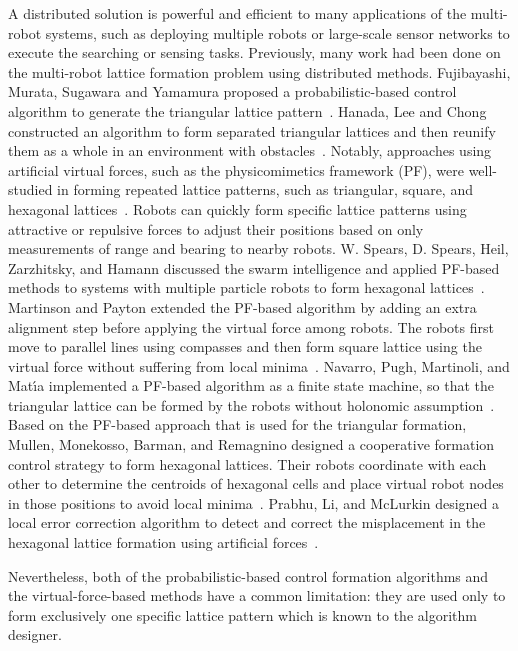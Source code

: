 A distributed solution is powerful and efficient to many applications of the multi-robot systems,
such as deploying multiple robots or large-scale sensor networks to execute the searching or sensing tasks. 
%
Previously, many work had been done on the multi-robot lattice formation
problem using distributed methods. 
%
Fujibayashi, Murata, Sugawara and Yamamura proposed a probabilistic-based control algorithm to generate the triangular lattice pattern~\cite{FujMurSugYam02}. 
%
Hanada, Lee and Chong constructed an algorithm to form separated triangular lattices and then reunify
them as a whole in an environment with obstacles~\cite{HanLeeCho07}.  
%
Notably, approaches using artificial virtual forces, such as the physicomimetics framework (PF), 
were well-studied in forming repeated lattice patterns, such as
triangular, square, and hexagonal lattices~\cite{FujMurSugYam02, HanLeeCho07,
  SpeSpeHamHei04, SpeHeiZar05, MarPay2005, NavPugMarMat09, LeeBecFekKroMcL14,
  PraLiMcLu12, MulMonBarRem13}. 
%  
Robots can quickly form specific lattice patterns using attractive or repulsive forces to adjust their positions based on only measurements of range and bearing to nearby robots.  
%
W. Spears, D. Spears, Heil, Zarzhitsky, and Hamann discussed the swarm intelligence and applied PF-based
methods to systems with multiple particle robots to form hexagonal lattices~\cite{SpeSpeHamHei04}.  
%
Martinson and Payton extended the PF-based algorithm by adding an extra alignment step before applying the virtual force among robots.  
%
The robots first move to parallel lines using compasses and then form square lattice using 
the virtual force without suffering from local minima~\cite{MarPay2005}.  
%
Navarro, Pugh, Martinoli, and Mat{\'\i}a implemented a PF-based algorithm as a finite state machine, so that the triangular lattice can be formed by the robots without holonomic assumption~\cite{NavPugMarMat09}.  
%
Based on the PF-based approach that is used for the triangular formation, Mullen, Monekosso, Barman, and Remagnino designed a cooperative formation control strategy to form hexagonal lattices. 
%
Their robots coordinate with each other to determine the centroids of hexagonal cells and place
virtual robot nodes in those positions to avoid local minima~\cite{MulMonBarRem13}. 
%
Prabhu, Li, and McLurkin designed a local error correction algorithm to detect and correct the misplacement in the hexagonal lattice formation using artificial forces~\cite{PraLiMcLu12}.


Nevertheless, both of the probabilistic-based control formation algorithms 
and the virtual-force-based methods have a common limitation: 
they are used only to form exclusively one specific lattice
pattern which is known to the algorithm designer.


